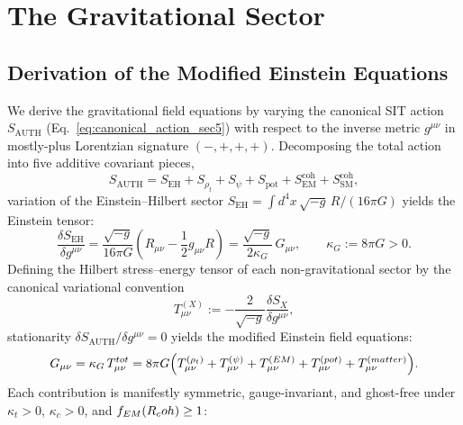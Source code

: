 \section{The Gravitational Sector}
\label{sec:gravitational-sector}

\subsection{Derivation of the Modified Einstein Equations}

We derive the gravitational field equations by varying the canonical SIT action $S_{\mathrm{AUTH}}$ (Eq.~\eqref{eq:canonical_action_sec5}) with respect to the inverse metric $g^{\mu\nu}$ in mostly-plus Lorentzian signature $(-,+,+,+)$. Decomposing the total action into five additive covariant pieces,
\begin{equation}
S_{\mathrm{AUTH}} = S_{\mathrm{EH}} + S_{\rho_t} + S_{\psi} + S_{\mathrm{pot}} + S_{\mathrm{EM}}^{\mathrm{coh}} + S_{\mathrm{SM}}^{\mathrm{coh}},
\label{eq:action_sector_split}
\end{equation}
variation of the Einstein--Hilbert sector $S_{\mathrm{EH}} = \int d^4x\,\sqrt{-g}\,R/(16\pi G)$ yields the Einstein tensor:
\begin{equation}
\frac{\delta S_{\mathrm{EH}}}{\delta g^{\mu\nu}}
= \frac{\sqrt{-g}}{16\pi G}\left(R_{\mu\nu} - \frac{1}{2}g_{\mu\nu}R\right)
= \frac{\sqrt{-g}}{2\kappa_G}\,G_{\mu\nu},
\qquad
\kappa_G := 8\pi G > 0.
\label{eq:eh_variation}
\end{equation}
Defining the Hilbert stress--energy tensor of each non-gravitational sector by the canonical variational convention
\[
T_{\mu\nu}^{(X)} := -\frac{2}{\sqrt{-g}}\frac{\delta S_X}{\delta g^{\mu\nu}},
\]
stationarity $\delta S_{\mathrm{AUTH}} / \delta g^{\mu\nu} = 0$ yields the modified Einstein field equations:
\begin{equation}
G_{\mu\nu}
= \kappa_G\,T_{\mu\nu}^{\mathrm{tot}}
= 8\pi G\Bigl(
  T_{\mu\nu}^{(\rho_t)}
  + T_{\mu\nu}^{(\psi)}
  + T_{\mu\nu}^{(\mathrm{EM})}
  + T_{\mu\nu}^{(\mathrm{pot})}
  + T_{\mu\nu}^{(\mathrm{matter})}
\Bigr).
\label{eq:Einstein-like}
\end{equation}
Each contribution is manifestly symmetric, gauge-invariant, and ghost-free under $\kappa_t > 0$, $\kappa_c > 0$, and $f_{\mathrm{EM}}(\Rcoh) \ge 1$:
